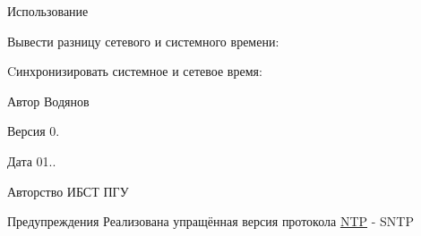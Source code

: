 Использование

Вывести разницу сетевого и системного времени\+: 
\begin{DoxyCode}{0}
\end{DoxyCode}
 Cинхронизировать системное и сетевое время\+: 
\begin{DoxyCode}{0}
\end{DoxyCode}
 \begin{DoxyAuthor}{Автор}
Водянов 
\end{DoxyAuthor}
\begin{DoxyVersion}{Версия}
0. 
\end{DoxyVersion}
\begin{DoxyDate}{Дата}
01.. 
\end{DoxyDate}
\begin{DoxyCopyright}{Авторство}
ИБСТ ПГУ 
\end{DoxyCopyright}
\begin{DoxyWarning}{Предупреждения}
Реализована упращённая версия протокола \mbox{\hyperlink{classNTP}{N\+TP}} -\/ S\+N\+TP 
\end{DoxyWarning}
